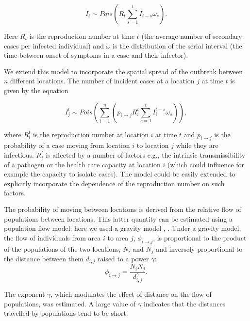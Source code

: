 \documentclass[9pt,twocolumn,twoside,lineno]{pnas-new}
\begin{document}
{\begin{equation*}
  I_{t} \sim 
  Pois
  \left( 
    R_t \sum_{s = 1}^{t}{I_{t - s}\omega_s}
  \right).
\end{equation*}

Here \(R_t\) is the reproduction number at time \(t\) (the average
number of secondary cases per infected individual) and \(\omega\) is the
distribution of the serial interval (the time between onset of symptoms
in a case and their infector).

We extend this model to incorporate the spatial spread of the outbreak
between \(n\) different locations. The number of incident cases at a
location \(j\) at time \(t\) is given by the equation

\begin{equation}
  I_{j}^{t} \sim 
  Pois\left( 
  \sum_{i = 1}^{n} 
  {\left( p_{i \rightarrow j}
  R_{i}^{t} \sum_{s = 1}^{t}{I_{i}^{t - s} \omega_{s}}
  \right)} 
  \right),
  \label{eq:likelihood}
\end{equation}

where \(R_{i}^{t}\) is the reproduction number at location \(i\) at time
\(t\) and \(p_{i \rightarrow j}\) is the probability of a case moving
from location \(i\) to location \(j\) while they are infectious.
\(R_{i}^{t}\) is affected by a number of factors e.g., the intrinsic
transmissibility of a pathogen or the health care capacity at location
\(i\) (which could influence for example the capacity to isolate cases).
The model could be easily extended to explicitly incorporate the
dependence of the reproduction number on such factors.

The probability of moving between locations is derived from the relative
flow of populations between locations. This latter quantity can be
estimated using a population flow model; here we used a gravity model
\cite{grosche2007175}, \cite{zipf1946p}. Under a gravity model, the flow
of individuals from area \(i\) to area \(j\),
\(\phi_{i \rightarrow j}\), is proportional to the product of the
populations of the two locations, \(N_i\) and \(N_j\) and inversely
proportional to the distance between them \(d_{i, j}\) raised to a
power $\gamma$:
\begin{equation*}
  \phi_{i \rightarrow j} =  \frac{N_iN_j}{d_{i, j}^{\gamma}}.
\end{equation*}

The exponent \(\gamma\),
which modulates the effect of distance on the flow of populations, was
estimated. A large value of \(\gamma\) indicates that the distances
travelled by populations tend to be short.

}
\end{document}

